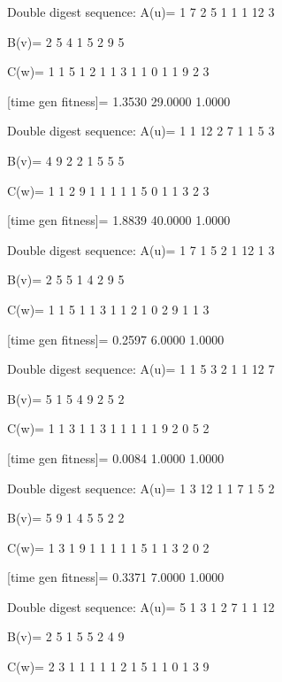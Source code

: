 Double digest sequence:
A(u)=
     1     7     2     5     1     1     1    12     3

B(v)=
     2     5     4     1     5     2     9     5

C(w)=
     1     1     5     1     2     1     1     3     1     1     0     1     1     9     2     3

[time gen fitness]=
    1.3530   29.0000    1.0000

Double digest sequence:
A(u)=
     1     1    12     2     7     1     1     5     3

B(v)=
     4     9     2     2     1     5     5     5

C(w)=
     1     1     2     9     1     1     1     1     1     5     0     1     1     3     2     3

[time gen fitness]=
    1.8839   40.0000    1.0000

Double digest sequence:
A(u)=
     1     7     1     5     2     1    12     1     3

B(v)=
     2     5     5     1     4     2     9     5

C(w)=
     1     1     5     1     1     3     1     1     2     1     0     2     9     1     1     3

[time gen fitness]=
    0.2597    6.0000    1.0000

Double digest sequence:
A(u)=
     1     1     5     3     2     1     1    12     7

B(v)=
     5     1     5     4     9     2     5     2

C(w)=
     1     1     3     1     1     3     1     1     1     1     1     9     2     0     5     2

[time gen fitness]=
    0.0084    1.0000    1.0000

Double digest sequence:
A(u)=
     1     3    12     1     1     7     1     5     2

B(v)=
     5     9     1     4     5     5     2     2

C(w)=
     1     3     1     9     1     1     1     1     1     5     1     1     3     2     0     2

[time gen fitness]=
    0.3371    7.0000    1.0000

Double digest sequence:
A(u)=
     5     1     3     1     2     7     1     1    12

B(v)=
     2     5     1     5     5     2     4     9

C(w)=
     2     3     1     1     1     1     1     2     1     5     1     1     0     1     3     9

